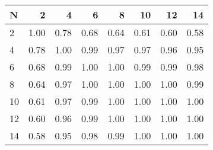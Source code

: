 \begin{tabular}{lrrrrrrr}
\toprule
N &    2  &    4  &    6  &    8  &    10 &    12 &    14 \\
\midrule
2  &  1.00 &  0.78 &  0.68 &  0.64 &  0.61 &  0.60 &  0.58 \\
4  &  0.78 &  1.00 &  0.99 &  0.97 &  0.97 &  0.96 &  0.95 \\
6  &  0.68 &  0.99 &  1.00 &  1.00 &  0.99 &  0.99 &  0.98 \\
8  &  0.64 &  0.97 &  1.00 &  1.00 &  1.00 &  1.00 &  0.99 \\
10 &  0.61 &  0.97 &  0.99 &  1.00 &  1.00 &  1.00 &  1.00 \\
12 &  0.60 &  0.96 &  0.99 &  1.00 &  1.00 &  1.00 &  1.00 \\
14 &  0.58 &  0.95 &  0.98 &  0.99 &  1.00 &  1.00 &  1.00 \\
\bottomrule
\end{tabular}
